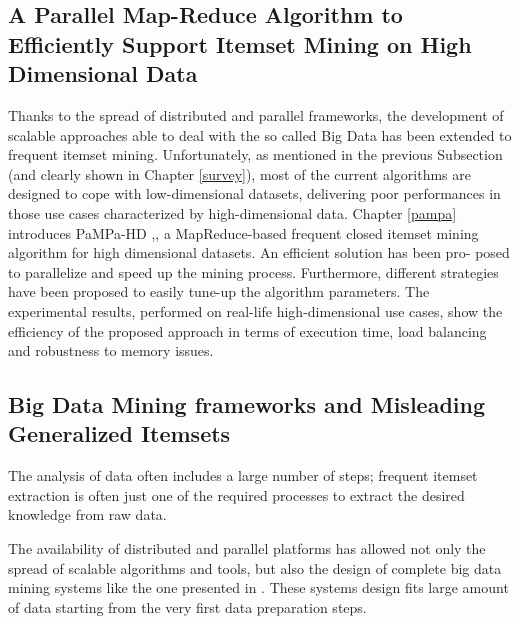\subsection{A Parallel Map-Reduce Algorithm to Efficiently
Support Itemset Mining on High Dimensional Data}
Thanks to the spread of distributed and parallel frameworks, the development of scalable approaches able to deal with the so called Big Data has been extended
to frequent itemset mining. Unfortunately, as mentioned in the previous Subsection (and clearly shown in Chapter \ref{survey}), most of the current algorithms are designed to cope with low-dimensional datasets, delivering poor performances in those use cases characterized by high-dimensional data. Chapter \ref{pampa} introduces 
PaMPa-HD \cite{pampa_v1},\cite{pampa_pulvi}, a MapReduce-based frequent closed itemset mining
algorithm for high dimensional datasets. An efficient solution has been pro-
posed to parallelize and speed up the mining process. Furthermore, different
strategies have been proposed to easily tune-up the algorithm parameters.
The experimental results, performed on real-life high-dimensional use cases,
show the efficiency of the proposed approach in terms of execution time, load
balancing and robustness to memory issues.

\subsection{Big Data Mining frameworks and Misleading Generalized Itemsets}
The analysis of data often includes a large number of steps; frequent itemset extraction is often just one of the required processes to extract the desired knowledge from raw data. 

The availability of distributed and parallel platforms has allowed not only the spread of scalable algorithms and tools, but also the design of complete big data mining systems like the one presented in \cite{baralis2014nemico}. These systems design fits large amount of data starting from the very first data preparation steps.

